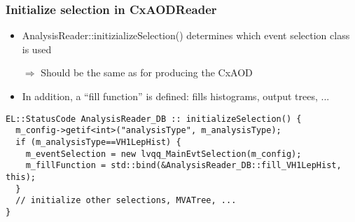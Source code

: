 \documentclass{beamer}
\begin{document}
\begin{frame}[fragile]
\frametitle{Initialize selection in CxAODReader}
\begin{itemize}
 \item AnalysisReader::initizializeSelection() determines which event selection class is used
 \item[$\Rightarrow$] Should be the same as for producing the CxAOD
 \item In addition, a ``fill function'' is defined: fills histograms, output trees, ...
\end{itemize}
\begin{center}
\begin{minipage}{0.9\textwidth}
{\tiny
\begin{lstlisting}
EL::StatusCode AnalysisReader_DB :: initializeSelection() {
  m_config->getif<int>("analysisType", m_analysisType);
  if (m_analysisType==VH1LepHist) {
    m_eventSelection = new lvqq_MainEvtSelection(m_config); 
    m_fillFunction = std::bind(&AnalysisReader_DB::fill_VH1LepHist, this);
  }
  // initialize other selections, MVATree, ...
}

\end{lstlisting}
}
\end{minipage}
\end{center}
\end{frame}
\end{document}
